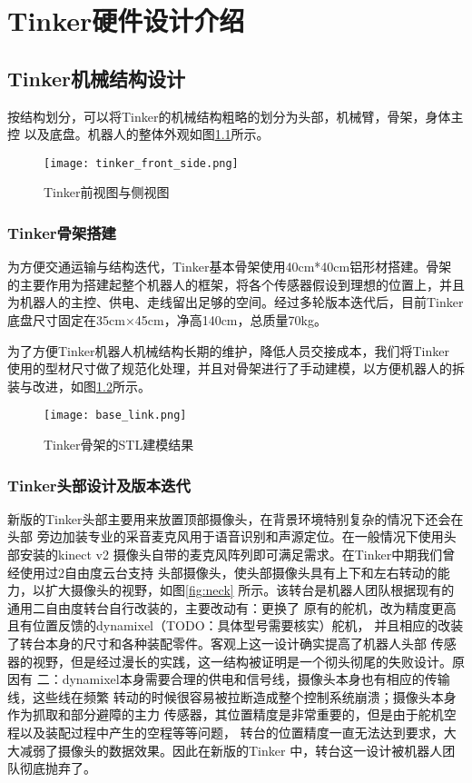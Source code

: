 
\chapter{Tinker硬件设计介绍}
\label{cha:chapter02}


\section{Tinker机械结构设计}

按结构划分，可以将Tinker的机械结构粗略的划分为头部，机械臂，骨架，身体主控
以及底盘。机器人的整体外观如图\ref{fig:tinker_front_side}所示。

\begin{figure}[ht] %
  \centering
  \texttt{[image: tinker\_front\_side.png]}
  \caption{Tinker前视图与侧视图}
  \label{fig:tinker_front_side}
\end{figure}

\subsection{Tinker骨架搭建}
为方便交通运输与结构迭代，Tinker基本骨架使用40cm*40cm铝形材搭建。骨架
的主要作用为搭建起整个机器人的框架，将各个传感器假设到理想的位置上，并且
为机器人的主控、供电、走线留出足够的空间。经过多轮版本迭代后，目前Tinker
底盘尺寸固定在35cm×45cm，净高140cm，总质量70kg。

为了方便Tinker机器人机械结构长期的维护，降低人员交接成本，我们将Tinker
使用的型材尺寸做了规范化处理，并且对骨架进行了手动建模，以方便机器人的拆
装与改进，如图\ref{fig:base_link}所示。

\begin{figure}[ht] %
  \centering
  \texttt{[image: base\_link.png]}
  \caption{Tinker骨架的STL建模结果}
  \label{fig:base_link}
\end{figure}

\subsection{Tinker头部设计及版本迭代}

新版的Tinker头部主要用来放置顶部摄像头，在背景环境特别复杂的情况下还会在头部
旁边加装专业的采音麦克风用于语音识别和声源定位。在一般情况下使用头部安装的kinect v2
摄像头自带的麦克风阵列即可满足需求。在Tinker中期我们曾经使用过2自由度云台支持
头部摄像头，使头部摄像头具有上下和左右转动的能力，以扩大摄像头的视野，如图\ref{fig:neck}
所示。该转台是机器人团队根据现有的通用二自由度转台自行改装的，主要改动有：更换了
原有的舵机，改为精度更高且有位置反馈的dynamixel（TODO：具体型号需要核实）舵机，
并且相应的改装了转台本身的尺寸和各种装配零件。客观上这一设计确实提高了机器人头部
传感器的视野，但是经过漫长的实践，这一结构被证明是一个彻头彻尾的失败设计。原因有
二：dynamixel本身需要合理的供电和信号线，摄像头本身也有相应的传输线，这些线在频繁
转动的时候很容易被拉断造成整个控制系统崩溃；摄像头本身作为抓取和部分避障的主力
传感器，其位置精度是非常重要的，但是由于舵机空程以及装配过程中产生的空程等等问题，
转台的位置精度一直无法达到要求，大大减弱了摄像头的数据效果。因此在新版的Tinker
中，转台这一设计被机器人团队彻底抛弃了。

